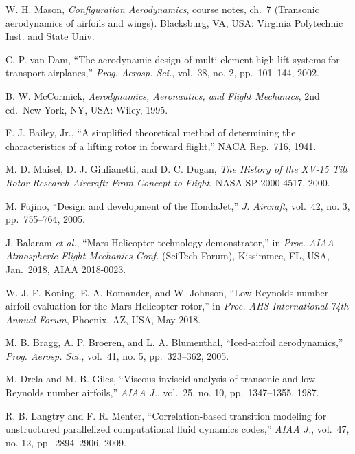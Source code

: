 \documentclass[10pt,a4paper,twocolumn]{article}
\begin{document}
\begin{list}{}{\setlength{\leftmargin}{2.2em}\setlength{\labelwidth}{2em}\setlength{\labelsep}{0.3em}\setlength{\itemsep}{1pt}\setlength{\parsep}{0pt}}
\item[{[26]}] W. H. Mason, \emph{Configuration Aerodynamics}, course notes,
ch.~7 (Transonic aerodynamics of airfoils and wings). Blacksburg, VA,
USA: Virginia Polytechnic Inst. and State Univ.

\item[{[27]}] C. P. van Dam, ``The aerodynamic design of multi-element
high-lift systems for transport airplanes,'' \emph{Prog. Aerosp. Sci.},
vol.~38, no. 2, pp.~101--144, 2002.

\item[{[28]}] B. W. McCormick, \emph{Aerodynamics, Aeronautics, and Flight
Mechanics}, 2nd ed.~New York, NY, USA: Wiley, 1995.

\item[{[29]}] F. J. Bailey, Jr., ``A simplified theoretical method of
determining the characteristics of a lifting rotor in forward flight,''
NACA Rep.~716, 1941.

\item[{[30]}] M. D. Maisel, D. J. Giulianetti, and D. C. Dugan, \emph{The
History of the XV-15 Tilt Rotor Research Aircraft: From Concept to
Flight}, NASA SP-2000-4517, 2000.

\item[{[31]}] M. Fujino, ``Design and development of the HondaJet,'' \emph{J.
Aircraft}, vol.~42, no. 3, pp.~755--764, 2005.

\item[{[32]}] J. Balaram \emph{et al.}, ``Mars Helicopter technology
demonstrator,'' in \emph{Proc. AIAA Atmospheric Flight Mechanics Conf.}
(SciTech Forum), Kissimmee, FL, USA, Jan.~2018, AIAA 2018-0023.

\item[{[33]}] W. J. F. Koning, E. A. Romander, and W. Johnson, ``Low Reynolds
number airfoil evaluation for the Mars Helicopter rotor,'' in
\emph{Proc. AHS International 74th Annual Forum}, Phoenix, AZ, USA, May
2018.

\item[{[34]}] M. B. Bragg, A. P. Broeren, and L. A. Blumenthal,
``Iced-airfoil aerodynamics,'' \emph{Prog. Aerosp. Sci.}, vol.~41, no.
5, pp.~323--362, 2005.

\item[{[35]}] M. Drela and M. B. Giles, ``Viscous-inviscid analysis of
transonic and low Reynolds number airfoils,'' \emph{AIAA J.}, vol.~25,
no. 10, pp.~1347--1355, 1987.

\item[{[36]}] R. B. Langtry and F. R. Menter, ``Correlation-based transition
modeling for unstructured parallelized computational fluid dynamics
codes,'' \emph{AIAA J.}, vol.~47, no. 12, pp.~2894--2906, 2009.

\end{list}\endgroup
\end{document}
